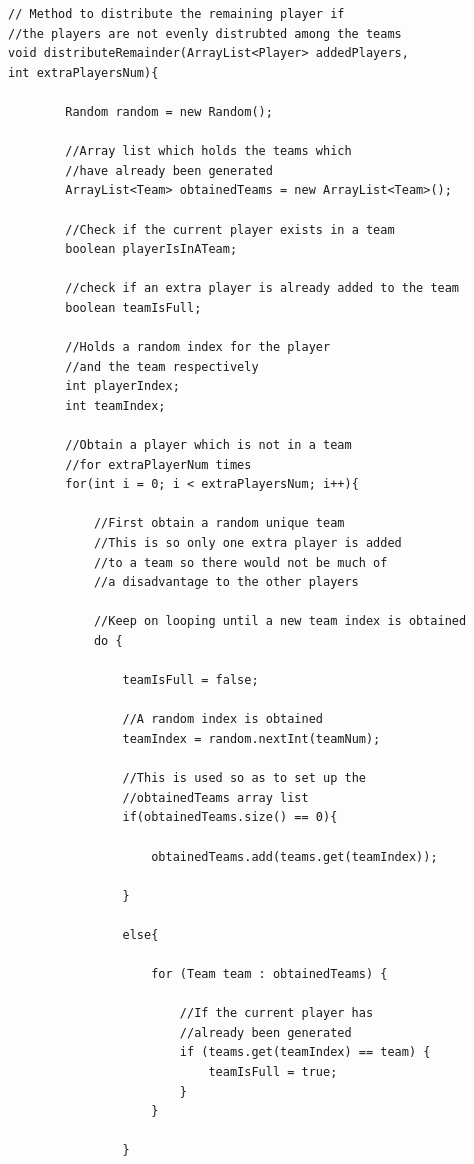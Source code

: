 \documentclass[a4paper,12pt]{extarticle}
\begin{document}
\begin{lstlisting}
// Method to distribute the remaining player if 
//the players are not evenly distrubted among the teams
void distributeRemainder(ArrayList<Player> addedPlayers,
int extraPlayersNum){

        Random random = new Random();

        //Array list which holds the teams which 
        //have already been generated
        ArrayList<Team> obtainedTeams = new ArrayList<Team>();

        //Check if the current player exists in a team
        boolean playerIsInATeam;

        //check if an extra player is already added to the team
        boolean teamIsFull;

        //Holds a random index for the player 
        //and the team respectively
        int playerIndex;
        int teamIndex;

        //Obtain a player which is not in a team 
        //for extraPlayerNum times
        for(int i = 0; i < extraPlayersNum; i++){

            //First obtain a random unique team
            //This is so only one extra player is added 
            //to a team so there would not be much of 
            //a disadvantage to the other players

            //Keep on looping until a new team index is obtained
            do {

                teamIsFull = false;

                //A random index is obtained
                teamIndex = random.nextInt(teamNum);

                //This is used so as to set up the 
                //obtainedTeams array list
                if(obtainedTeams.size() == 0){

                    obtainedTeams.add(teams.get(teamIndex));

                }

                else{

                    for (Team team : obtainedTeams) {

                        //If the current player has 
                        //already been generated
                        if (teams.get(teamIndex) == team) {
                            teamIsFull = true;
                        }
                    }

                }


\end{lstlisting}
\end{document}
